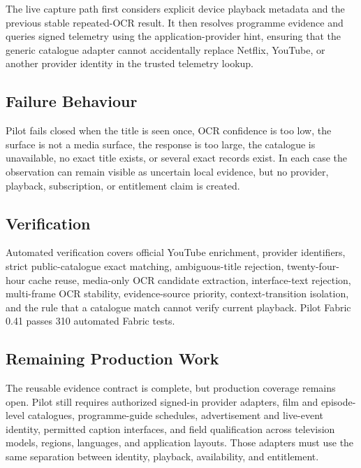The live capture path first considers explicit device playback metadata and the
previous stable repeated-OCR result. It then resolves programme evidence and
queries signed telemetry using the application-provider hint, ensuring that the
generic catalogue adapter cannot accidentally replace Netflix, YouTube, or another
provider identity in the trusted telemetry lookup.

\subsection{Failure Behaviour}

Pilot fails closed when the title is seen once, OCR confidence is too low, the
surface is not a media surface, the response is too large, the catalogue is
unavailable, no exact title exists, or several exact records exist. In each case
the observation can remain visible as uncertain local evidence, but no provider,
playback, subscription, or entitlement claim is created.

\subsection{Verification}

Automated verification covers official YouTube enrichment, provider identifiers,
strict public-catalogue exact matching, ambiguous-title rejection, twenty-four-hour
cache reuse, media-only OCR candidate extraction, interface-text rejection,
multi-frame OCR stability, evidence-source priority, context-transition isolation,
and the rule that a catalogue match cannot verify current playback. Pilot Fabric
0.41 passes 310 automated Fabric tests.

\subsection{Remaining Production Work}

The reusable evidence contract is complete, but production coverage remains open.
Pilot still requires authorized signed-in provider adapters, film and episode-level
catalogues, programme-guide schedules, advertisement and live-event identity,
permitted caption interfaces, and field qualification across television models,
regions, languages, and application layouts. Those adapters must use the same
separation between identity, playback, availability, and entitlement.
